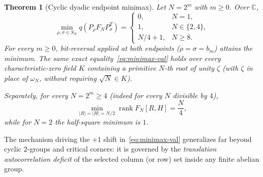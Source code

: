 \documentclass[11pt,reqno]{amsart}
\numberwithin{equation}{section}
\newtheorem{theorem}{Theorem}[section]
\theoremstyle{definition}
\theoremstyle{remark}
\newcommand{\C}{\mathbb{C}}
\newcommand{\rank}{\operatorname{rank}}
\begin{document}
\begin{theorem}[Cyclic dyadic endpoint minimax]
\label{thm:minimax}
Let $N=2^m$ with $m\ge 0$. Over $\C$,
\begin{equation}
\label{eq:minimax-val}
\min_{\rho,\sigma\in S_N} q(P_\rho F_N P_\sigma^T) =
\begin{cases}
0, & N=1,\\
1, & N\in\{2,4\},\\
N/4 + 1, & N\ge 8.
\end{cases}
\end{equation}
For every $m\ge 0$, bit-reversal applied at both endpoints ($\rho=\sigma=b_m$) attains the minimum. The same exact equality~\eqref{eq:minimax-val} holds over every characteristic-zero field $K$ containing a primitive $N$-th root of unity $\zeta$ (with $\zeta$ in place of $\omega_N$, without requiring $\sqrt{N}\in K$).

Separately, for every $N=2^m\ge 4$ (indeed for every $N$ divisible by $4$),
\begin{equation}
\label{eq:half-sq}
\min_{|R|=|H|=N/2} \rank F_N[R,H] = \frac{N}{4},
\end{equation}
while for $N=2$ the half-square minimum is $1$.
\end{theorem}

The mechanism driving the $+1$ shift in~\eqref{eq:minimax-val} generalizes far beyond cyclic $2$-groups and critical corners: it is governed by the \emph{translation autocorrelation deficit} of the selected column (or row) set inside any finite abelian group.
\end{document}
